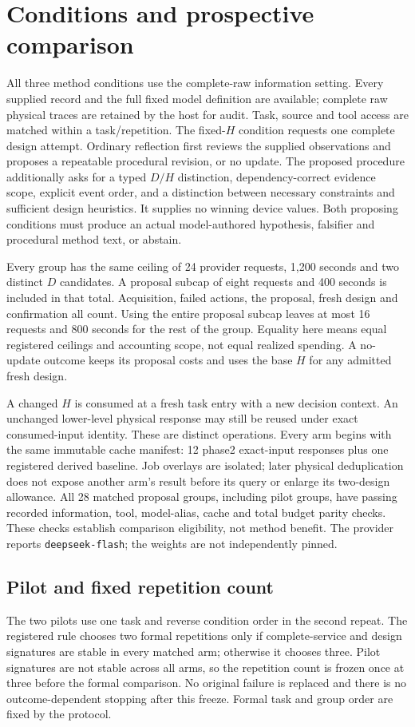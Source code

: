 \section{Conditions and prospective comparison}
All three method conditions use the complete-raw information setting. Every
supplied record and the full fixed model definition are available; complete
raw physical traces are retained by the host for audit. Task, source and tool
access are matched within a task/repetition. The fixed-$H$ condition requests
one complete design attempt. Ordinary reflection first reviews the supplied
observations and proposes a repeatable procedural revision, or no update.
The proposed procedure additionally asks for a typed $D/H$ distinction,
dependency-correct evidence scope, explicit event order, and a distinction
between necessary constraints and sufficient design heuristics. It supplies
no winning device values. Both proposing conditions must produce an actual
model-authored hypothesis, falsifier and procedural method text, or abstain.

Every group has the same ceiling of 24 provider requests, 1,200 seconds and
two distinct $D$ candidates. A proposal subcap of eight requests and 400 seconds
is included in that total. Acquisition, failed actions, the proposal, fresh
design and confirmation all count. Using the entire proposal subcap leaves
at most 16 requests and 800 seconds for the rest of the group. Equality here
means equal registered ceilings and accounting scope, not equal realized
spending. A no-update outcome keeps its proposal costs and uses the base $H$
for any admitted fresh design.

A changed $H$ is consumed at a fresh task entry with a new decision context.
An unchanged lower-level physical response may still be reused under exact
consumed-input identity. These are distinct operations. Every arm begins with
the same immutable cache manifest: 12 phase2 exact-input responses plus one
registered derived baseline. Job overlays are isolated; later physical
deduplication does not expose another arm's result before its query or enlarge
its two-design allowance. All 28 matched proposal groups, including pilot
groups, have passing recorded information, tool, model-alias, cache and total
budget parity checks. These checks establish comparison eligibility, not
method benefit. The provider reports \texttt{deepseek-flash}; the weights are
not independently pinned.

\subsection{Pilot and fixed repetition count}
The two pilots use one task and reverse condition order in the second repeat.
The registered rule chooses two formal repetitions only if complete-service
and design signatures are stable in every matched arm; otherwise it chooses
three. Pilot signatures are not stable across all arms, so the repetition
count is frozen once at three before the formal comparison. No original
failure is replaced and there is no outcome-dependent stopping after this
freeze. Formal task and group order are fixed by the protocol.

